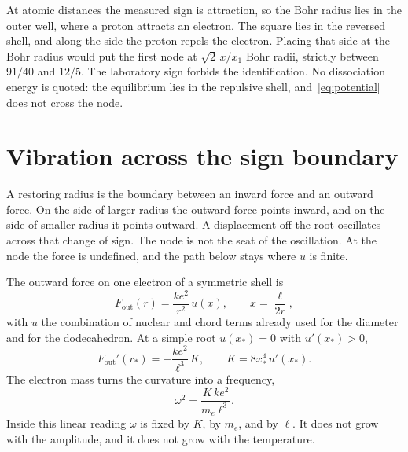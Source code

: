 \documentclass[a4paper]{article}
\begin{document}
At atomic distances the measured sign is attraction, so the Bohr radius lies in the outer well, where a proton attracts an electron. The square lies in the reversed shell, and along the side the proton repels the electron. Placing that side at the Bohr radius would put the first node at \(\sqrt{2}\,x/x_1\) Bohr radii, strictly between \(91/40\) and \(12/5\). The laboratory sign forbids the identification. No dissociation energy is quoted: the equilibrium lies in the repulsive shell, and~\eqref{eq:potential} does not cross the node.

\section{Vibration across the sign boundary}
\label{sec:heat}

A restoring radius is the boundary between an inward force and an outward force. On the side of larger radius the outward force points inward, and on the side of smaller radius it points outward. A displacement off the root oscillates across that change of sign. The node is not the seat of the oscillation. At the node the force is undefined, and the path below stays where \(u\) is finite.

The outward force on one electron of a symmetric shell is
\begin{equation}
\label{eq:Fout}
F_{\mathrm{out}}(r)=\frac{k e^{2}}{r^{2}}\,u(x),
\qquad
x=\frac{\ell}{2r},
\end{equation}
with \(u\) the combination of nuclear and chord terms already used for the diameter and for the dodecahedron. At a simple root \(u(x_*)=0\) with \(u'(x_*)>0\),
\begin{equation}
\label{eq:curv}
F_{\mathrm{out}}'(r_*)=-\frac{k e^{2}}{\ell^{3}}\,K,
\qquad
K=8x_*^4\,u'(x_*).
\end{equation}
The electron mass turns the curvature into a frequency,
\begin{equation}
\label{eq:omega}
\omega^{2}=\frac{K\,k e^{2}}{m_e\ell^{3}}.
\end{equation}
Inside this linear reading \(\omega\) is fixed by \(K\), by \(m_e\), and by \(\ell\). It does not grow with the amplitude, and it does not grow with the temperature.
\end{document}
